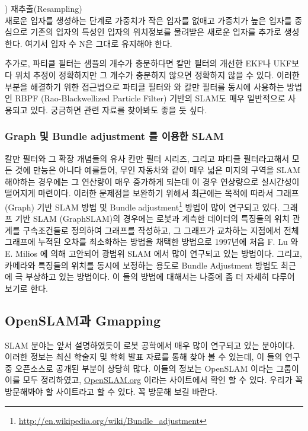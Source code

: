 \vspace{\baselineskip}
\noindent
{}
\thenum) 재추출(Resampling)\\
새로운 입자를 생성하는 단계로 가중치가 작은 입자를 없애고 가중치가 높은 입자를 중심으로 기존의 입자의 특성인 입자의 위치정보를 물려받은 새로운 입자를 추가로 생성한다. 여기서 입자 수 N은 그대로 유지해야 한다.

추가로, 파티클 필터는 샘플의 개수가 충분하다면 칼만 필터의 개선한 EKF나 UKF보다 위치 추정이 정확하지만 그 개수가 충분하지 않으면 정확하지 않을 수 있다. 이러한 부분을 해결하기 위한 접근법으로 파티클 필터와 와 칼만 필터를 동시에 사용하는 방법인 RBPF (Rao-Blackwellized Particle Filter)\cite{grisetti2005improving,grisetti2007improved} 기반의 SLAM도 매우 일반적으로 사용되고 있다. 궁금하면 관련 자료를 찾아봐도 좋을 듯 싶다.


\subsubsection{Graph 및 Bundle adjustment 를 이용한 SLAM}

칼만 필터와 그 확장 개념들의 유사 칸만 필터 시리즈, 그리고 파티클 필터라고해서 모든 것에 만능은 아니다 예를들어, 무인 자동차와 같이 매우 넓은 미지의 구역을 SLAM 해야하는 경우에는 그 연산량이 매우 증가하게 되는데 이 경우 연상량으로 실시간성이 떨어지게 마련이다. 이러한 문제점을 보완하기 위해서 최근에는 목적에 따라서 그래프(Graph) 기반 SLAM 방법 및 Bundle adjustment\footnote{\url{http://en.wikipedia.org/wiki/Bundle_adjustment}} 방법이 많이 연구되고 있다. 그래프 기반 SLAM (GraphSLAM)의 경우에는 로봇과 계측한 데이터의 특징들의 위치 관계를 구속조건들로 정의하여 그래프를 작성하고, 그 그래프가 교차하는 지점에서 전체 그래프에 누적된 오차를 최소화하는 방법을 채택한 방법으로 1997년에 처음 F. Lu 와 E. Milios 에 의해 고안되어 광범위 SLAM 에서 많이 연구되고 있는 방법이다. 그리고, 카메라와 특징들의 위치를 동시에 보정하는 용도로 Bundle Adjustment 방법도 최근에 극 부상하고 있는 방법이다. 이 들의 방법에 대해서는 나중에 좀 더 자세히 다루어 보기로 한다.


\subsection{OpenSLAM과 Gmapping}

SLAM 분야는 앞서 설명하였듯이 로봇 공학에서 매우 많이 연구되고 있는 분야이다. 이러한 정보는 최신 학술지 및 학회 발표 자료를 통해 찾아 볼 수 있는데, 이 들의 연구 중 오픈소스로 공개된 부분이 상당히 많다. 이들의 정보는 OpenSLAM 이라는 그룹이 이를 모두 정리하였고, \url{OpenSLAM.org} 이라는 사이트에서 확인 할 수 있다. 우리가 꼭 방문해봐야 할 사이트라고 할 수 있다. 꼭 방문해 보길 바란다.

